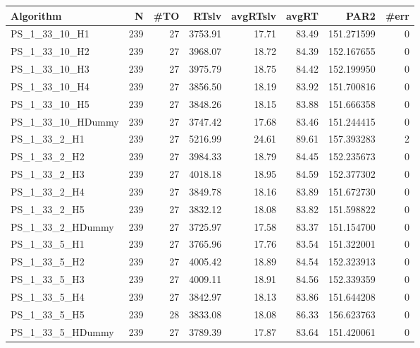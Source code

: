 \begin{tabular}{lrrrrrrr}
\toprule
        Algorithm &   N &  \#TO &   RTslv &  avgRTslv &  avgRT &       PAR2 &  \#err \\
\midrule
    PS\_1\_33\_10\_H1 & 239 &   27 & 3753.91 &     17.71 &  83.49 & 151.271599 &     0 \\
    PS\_1\_33\_10\_H2 & 239 &   27 & 3968.07 &     18.72 &  84.39 & 152.167655 &     0 \\
    PS\_1\_33\_10\_H3 & 239 &   27 & 3975.79 &     18.75 &  84.42 & 152.199950 &     0 \\
    PS\_1\_33\_10\_H4 & 239 &   27 & 3856.50 &     18.19 &  83.92 & 151.700816 &     0 \\
    PS\_1\_33\_10\_H5 & 239 &   27 & 3848.26 &     18.15 &  83.88 & 151.666358 &     0 \\
PS\_1\_33\_10\_HDummy & 239 &   27 & 3747.42 &     17.68 &  83.46 & 151.244415 &     0 \\
     PS\_1\_33\_2\_H1 & 239 &   27 & 5216.99 &     24.61 &  89.61 & 157.393283 &     2 \\
     PS\_1\_33\_2\_H2 & 239 &   27 & 3984.33 &     18.79 &  84.45 & 152.235673 &     0 \\
     PS\_1\_33\_2\_H3 & 239 &   27 & 4018.18 &     18.95 &  84.59 & 152.377302 &     0 \\
     PS\_1\_33\_2\_H4 & 239 &   27 & 3849.78 &     18.16 &  83.89 & 151.672730 &     0 \\
     PS\_1\_33\_2\_H5 & 239 &   27 & 3832.12 &     18.08 &  83.82 & 151.598822 &     0 \\
 PS\_1\_33\_2\_HDummy & 239 &   27 & 3725.97 &     17.58 &  83.37 & 151.154700 &     0 \\
     PS\_1\_33\_5\_H1 & 239 &   27 & 3765.96 &     17.76 &  83.54 & 151.322001 &     0 \\
     PS\_1\_33\_5\_H2 & 239 &   27 & 4005.42 &     18.89 &  84.54 & 152.323913 &     0 \\
     PS\_1\_33\_5\_H3 & 239 &   27 & 4009.11 &     18.91 &  84.56 & 152.339359 &     0 \\
     PS\_1\_33\_5\_H4 & 239 &   27 & 3842.97 &     18.13 &  83.86 & 151.644208 &     0 \\
     PS\_1\_33\_5\_H5 & 239 &   28 & 3833.08 &     18.08 &  86.33 & 156.623763 &     0 \\
 PS\_1\_33\_5\_HDummy & 239 &   27 & 3789.39 &     17.87 &  83.64 & 151.420061 &     0 \\
\bottomrule
\end{tabular}
